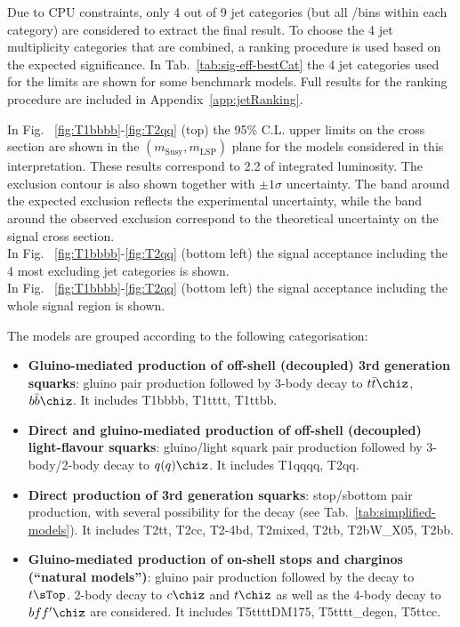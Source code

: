 Due to CPU constraints, only 4 out of 9 jet categories (but all \nb/\scalht bins
within each category) are considered to extract the final result. 
To choose the 4 jet multiplicity categories that are combined, a ranking procedure 
is used based on the expected significance. 
In Tab.~\ref{tab:sig-eff-bestCat} the 4 jet categories used for the limits are shown for some benchmark models. 
Full results for the ranking procedure are included in Appendix~\ref{app:jetRanking}. 

In Fig. ~\ref{fig:T1bbbb}-\ref{fig:T2qq} (top) the 95\% C.L. upper limits on the cross section are shown 
in the $(m_{\mathrm{Susy}},m_{\mathrm{LSP}})$ plane for the models considered in this interpretation. 
These results correspond to 2.2 \ifb of integrated luminosity. 
The exclusion contour is also shown together with $\pm1\sigma$ uncertainty. 
The band around the expected exclusion reflects the experimental uncertainty, 
while the band around the observed exclusion correspond to the theoretical 
uncertainty on the signal cross section.\\
In Fig. ~\ref{fig:T1bbbb}-\ref{fig:T2qq} (bottom left) the signal acceptance 
including the 4 most excluding jet categories is shown. \\
In Fig. ~\ref{fig:T1bbbb}-\ref{fig:T2qq} (bottom left) the signal acceptance 
including the whole signal region is shown.

The models are grouped according to the following categorisation:
\begin{itemize}
\item \textbf{Gluino-mediated production of off-shell (decoupled) 3rd generation squarks}: gluino pair production followed by 3-body decay to $t\bar{t}\chiz$,$b\bar{b}\chiz$. 
  It includes T1bbbb, T1tttt, T1ttbb. 
\item \textbf{Direct and gluino-mediated production of off-shell (decoupled) light-flavour squarks}: gluino/light squark pair production followed by 3-body/2-body decay to $q(q)\chiz$. 
  It includes T1qqqq, T2qq. 
\item \textbf{Direct production of 3rd generation squarks}: stop/sbottom pair production, with several possibility for the decay (see Tab.~\ref{tab:simplified-models}). 
  It includes T2tt, T2cc, T2-4bd, T2mixed, T2tb, T2bW\_X05, T2bb. 
\item \textbf{Gluino-mediated production of on-shell stops and charginos (``natural models'')}: gluino pair production followed by the decay to $t\sTop$. 2-body decay to $c\chiz$ and $t\chiz$ as well as  
  the 4-body decay to $bff'\chiz$ are considered. It includes T5ttttDM175, T5tttt\_degen, T5ttcc. 
\end{itemize} 


